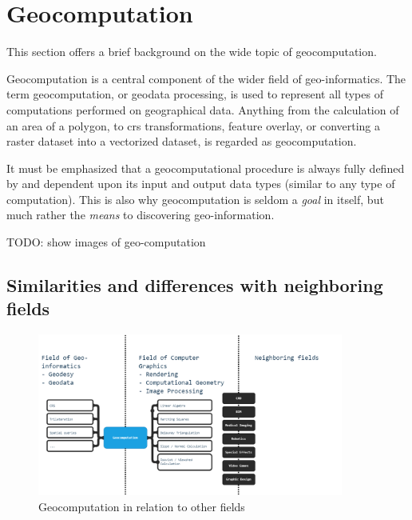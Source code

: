 \section{Geocomputation}
\label{sec:background-geo}

This section offers a brief background on the wide topic of geocomputation. 


Geocomputation is a central component of the wider field of geo-informatics. 
The term geocomputation, or geodata processing, is used to represent all types of computations performed on geographical data. 
Anything from the calculation of an area of a polygon, to \ac{crs} transformations, feature overlay, or converting a raster dataset into a vectorized dataset, is regarded as geocomputation.

It must be emphasized that a geocomputational procedure is always fully defined by and dependent upon its input and output data types (similar to any type of computation). 
This is also why geocomputation is seldom a \emph{goal} in itself, but much rather the \emph{means} to discovering geo-information. 

\begin{note}
  TODO: show images of geo-computation
\end{note}

\subsection{Similarities and differences with neighboring fields}

\begin{figure}
  \centering
  \graphicspath{ {../../assets/diagrams/} }
  \includegraphics[width=380px]{geocomputation.png}
  \caption{Geocomputation in relation to other fields}
  \label{fig:geocomputation}
\end{figure}

